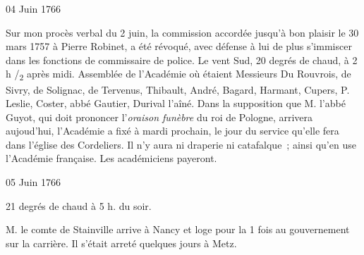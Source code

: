                     
                     \begin{diary}{04 Juin 1766}{}
                        
                         Sur mon procès verbal du
                              2 juin, la commission
                           accordée jusqu'à bon plaisir le 30 mars
                              1757 à
                           Pierre Robinet, a été
                           révoqué, avec défense à
                           lui de plus s'immiscer dans les fonctions
                           de commissaire de police.
                           Le vent Sud, 20 degrés de chaud, à 2 h /\textsubscript{2}
                              après midi.
                           Assemblée de l'Académie où
                           étaient Messieurs
                           Du Rouvrois, de Sivry, de
                              Solignac, de Tervenus,
                           Thibault, André, Bagard, Harmant,
                              Cupers,
                           P. Leslie, Coster, abbé
                              Gautier, Durival
                              l'aîné.
                           Dans la supposition que M. l'abbé Guyot,
                           qui doit prononcer l'\emph{oraison funèbre} du roi de Pologne,
                           arrivera aujoud'hui, l'Académie a fixé à
                           mardi prochain, le jour du service qu'elle fera
                           dans l’église des
                              Cordeliers. Il n'y aura ni
                           draperie ni catafalque ;
                           ainsi qu'en use
                           l'Académie
                              française. Les académiciens
                           payeront. \bigskip
        
        
                     \end{diary}

                     \begin{diary}{05 Juin 1766}{}
                        
                        
                           21 degrés de chaud à 5 h. du soir. \bigskip
        
        
                        
                           M. le comte de Stainville arrive à
                              Nancy
                           et loge pour la 1 fois au gouvernement sur
                           la carrière. Il s'était arreté quelques jours
                           à Metz. \bigskip
        
        
                     \end{diary}


